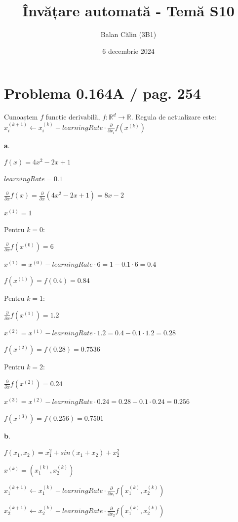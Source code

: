 \documentclass{article}
\title{Învățare automată - Temă S10}
\author{Balan Călin (3B1)}
\date{6 decembrie 2024}
\begin{document}
\maketitle

\section*{Problema 0.164A / pag. 254}

Cunoaștem \( f \) funcție derivabilă, \( f : \mathbb{R}^d \to \mathbb{R} \). \newline
Regula de actualizare este: \( x_i^{(k+1)} \leftarrow x_i^{(k)} - learningRate \cdot \frac{\partial}{\partial x_i} f(x^{(k)}) \)

\noindent \textbf{a}.

\( f(x) = 4x^2 - 2x + 1 \)

\( learningRate = 0.1 \)

\(\frac{\partial}{\partial x}f(x) = \frac{\partial}{\partial x}(4x^2-2x+1) = 8x-2\)

\( x^{(1)} = 1 \)

Pentru \( k = 0 \):

\( \frac{\partial}{\partial x} f(x^{(0)}) = 6 \)

\( x^{(1)} = x^{(0)} - learningRate \cdot 6 = 1 - 0.1 \cdot 6 = 0.4 \)

\( f(x^{(1)}) = f(0.4) = 0.84 \)

Pentru \( k = 1 \):

\( \frac{\partial}{\partial x} f(x^{(1)}) = 1.2 \)

\( x^{(2)} = x^{(1)} - learningRate \cdot 1.2 = 0.4 - 0.1 \cdot 1.2 = 0.28 \)

\( f(x^{(2)}) = f(0.28) = 0.7536 \)

Pentru \( k = 2 \):

\( \frac{\partial}{\partial x} f(x^{(2)}) = 0.24 \)

\( x^{(3)} = x^{(2)} - learningRate \cdot 0.24 = 0.28 - 0.1 \cdot 0.24 = 0.256 \)

\( f(x^{(3)}) = f(0.256) = 0.7501 \)

\noindent \textbf{b}.

\( f(x_1, x_2) = x_1^2 + sin(x_1 + x_2) + x_2^2 \)

\( x^{(k)} = (x_1^{(k)}, x_2^{(k)}) \)

\( x_1^{(k+1)} \leftarrow x_1^{(k)} - learningRate \cdot \frac{\partial}{\partial x_1} f(x_1^{(k)}, x_2^{(k)}) \)

\( x_2^{(k+1)} \leftarrow x_2^{(k)} - learningRate \cdot \frac{\partial}{\partial x_2} f(x_1^{(k)}, x_2^{(k)}) \)
\end{document}
